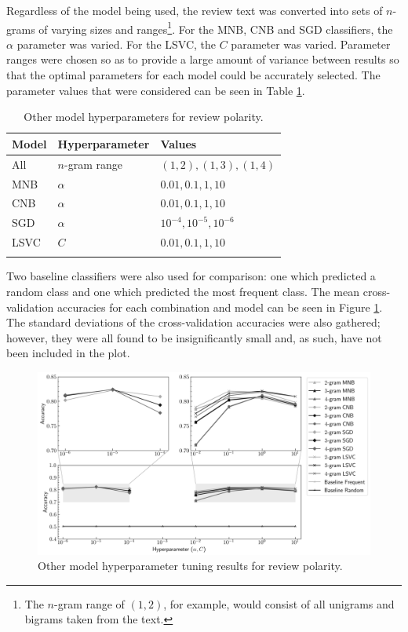 Regardless of the model being used, the review text was converted into sets of $n$-grams of varying sizes and ranges\footnote{The $n$-gram range of $(1, 2)$, for example, would consist of all unigrams and bigrams taken from the text.}. For the MNB, CNB and SGD classifiers, the $\alpha$ parameter was varied. For the LSVC, the $C$ parameter was varied. Parameter ranges were chosen so as to provide a large amount of variance between results so that the optimal parameters for each model could be accurately selected. The parameter values that were considered can be seen in Table \ref{tab:DI_RF_Pol_BaseHP}.

\begin{table}[ht]
    \centering
    \begin{tabular}{l l l}
        \toprule
        \textbf{Model} & \textbf{Hyperparameter} & \textbf{Values}\\\midrule
        All & $n$-gram range & $(1, 2), (1, 3), (1, 4)$\\
        MNB & $\alpha$ & $0.01, 0.1, 1, 10$\\
        CNB & $\alpha$ & $0.01, 0.1, 1, 10$\\
        SGD & $\alpha$ & $10^{-4}, 10^{-5}, 10^{-6}$\\
        LSVC & $C$ & $0.01, 0.1, 1, 10$\\
        \bottomrule\\
    \end{tabular}
    \caption{Other model hyperparameters for review polarity.}
    \label{tab:DI_RF_Pol_BaseHP}
\end{table}

Two baseline classifiers were also used for comparison: one which predicted a random class and one which predicted the most frequent class. The mean cross-validation accuracies for each combination and model can be seen in Figure \ref{fig:DI_RF_Pol_BaseHP}. The standard deviations of the cross-validation accuracies were also gathered; however, they were all found to be insignificantly small and, as such, have not been included in the plot.

\begin{figure}[ht]
    \hspace*{-0.3in}
    \includegraphics[scale=0.55]{figures/05_impl/01_rfp/01_pol/plot_hyperparams_base.png}
    \caption{Other model hyperparameter tuning results for review polarity.}
    \label{fig:DI_RF_Pol_BaseHP}
\end{figure}

